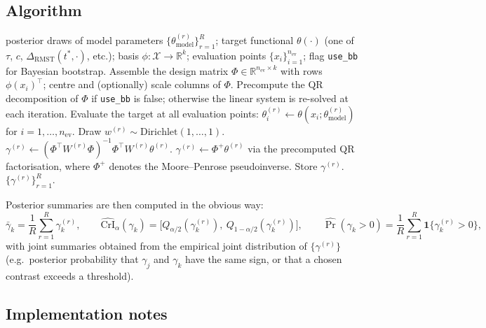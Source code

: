 \documentclass[11pt]{article}
\newcommand{\tauf}{\tau}
\newcommand{\cf}{c}
\newcommand{\RMST}{\mathrm{RMST}}
\begin{document}
\subsection{Algorithm}

\begin{algorithm}[h]
\caption{Posterior projection summary}
\label{alg:projection}
\begin{algorithmic}[1]
\Require posterior draws of model parameters $\{\theta_{\text{model}}^{(r)}\}_{r=1}^{R}$;
target functional $\theta(\cdot)$ (one of $\tauf$, $\cf$,
$\Delta_{\RMST}(t^{*}, \cdot)$, etc.);
basis $\phi : \mathcal{X} \to \mathbb{R}^{k}$;
evaluation points $\{x_{i}\}_{i=1}^{n_{\mathrm{ev}}}$;
flag \texttt{use\_bb} for Bayesian bootstrap.
\Statex
\State Assemble the design matrix $\Phi \in \mathbb{R}^{n_{\mathrm{ev}} \times k}$
with rows $\phi(x_{i})^{\top}$; centre and (optionally) scale columns of
$\Phi$.
\State Precompute the QR decomposition of $\Phi$ if \texttt{use\_bb} is
false; otherwise the linear system is re-solved at each iteration.
  \State Evaluate the target at all evaluation points:
         $\theta^{(r)}_{i} \gets \theta(x_{i}; \theta_{\text{model}}^{(r)})$
         for $i = 1, \ldots, n_{\mathrm{ev}}$.
    \State Draw $w^{(r)} \sim \mathrm{Dirichlet}(1, \ldots, 1)$.
    \State $\gamma^{(r)} \gets (\Phi^{\top} W^{(r)} \Phi)^{-1}
                                \Phi^{\top} W^{(r)} \theta^{(r)}$.
  \Else
    \State $\gamma^{(r)} \gets \Phi^{+} \theta^{(r)}$ via the
           precomputed QR factorisation, where $\Phi^{+}$ denotes the
           Moore--Penrose pseudoinverse.
  \EndIf
  \State Store $\gamma^{(r)}$.
\EndFor
\State \Return $\{\gamma^{(r)}\}_{r=1}^{R}$.
\end{algorithmic}
\end{algorithm}

Posterior summaries are then computed in the obvious way:
\[
  \bar{\gamma}_{k} = \frac{1}{R}\sum_{r=1}^{R}\gamma_{k}^{(r)},
  \qquad
  \widehat{\mathrm{CrI}}_{\alpha}(\gamma_{k}) =
  \bigl[Q_{\alpha/2}(\gamma_{k}^{(r)}),\ Q_{1-\alpha/2}(\gamma_{k}^{(r)})\bigr],
  \qquad
  \widehat{\Pr}(\gamma_{k} > 0) = \frac{1}{R}\sum_{r=1}^{R}
  \mathbf{1}\{\gamma_{k}^{(r)} > 0\},
\]
with joint summaries obtained from the empirical joint distribution of
$\{\gamma^{(r)}\}$ (e.g.\ posterior probability that $\gamma_{j}$ and
$\gamma_{k}$ have the same sign, or that a chosen contrast exceeds a
threshold).

\subsection{Implementation notes}
\end{document}
